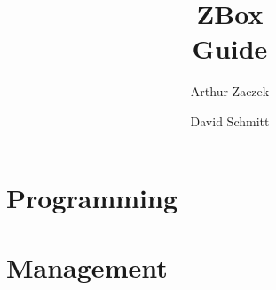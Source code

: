 \documentclass[a4paper,12pt]{report}
\begin{document}
\addtolength{\textheight}{2cm}
\addtolength{\topmargin}{-1cm}


\newenvironment{note}
{\vspace*{5mm}\begin{framed}\rule{1ex}{1ex}\hspace{\stretch{1}} Note: }
{\hspace{\stretch{1}}\rule{1ex}{1ex}\end{framed}}


\title{ZBox\\Guide}
\author{Arthur Zaczek}
\author{David Schmitt}

\pagestyle{empty}



\tableofcontents

\setlength{\headheight}{15pt}

\pagestyle{fancy}

\renewcommand{\chaptermark}[1]{\markboth{\chaptername\ \thechapter.\ #1}{}}
\renewcommand{\sectionmark}[1]{\markright{\thesection.\ #1}}

\newenvironment{descriptionBorder}
{
  \begin{framed}
  \begin{description}[labelindent=3mm,leftmargin=*,topsep=0mm]
}
{
  \end{description}
  \end{framed}
}



\chapter{Programming}


\chapter{Management}




% 
\end{document}
